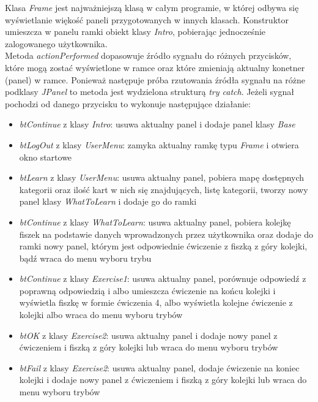 \documentclass[11pt]{article}
\begin{document}
Klasa \textit{Frame} jest najważniejszą klasą w całym programie, w której odbywa się wyświetlanie więkość paneli przygotowanych w innych klasach. Konstruktor umieszcza w panelu ramki obiekt klasy \textit{Intro}, pobierając jednocześnie zalogowanego użytkownika. \\
Metoda \textit{actionPerformed} dopasowuje źródło sygnału do różnych przycisków, które mogą zostać wyświetlone w ramce oraz które zmieniają aktualny konetner (panel) w ramce. Ponieważ następuje próba rzutowania źródła sygnału na różne podklasy \textit{JPanel} to metoda jest wydzielona strukturą \textit{try catch}. Jeżeli sygnał pochodzi od danego przycisku to wykonuje następujące działanie:
\begin{itemize}
	\item \textit{btContinue} z klasy \textit{Intro}: usuwa aktualny panel i dodaje panel klasy \textit{Base}
	
	\item \textit{btLogOut} z klasy \textit{UserMenu}: zamyka aktualny ramkę typu \textit{Frame} i otwiera okno startowe
	
	\item \textit{btLearn} z klasy \textit{UserMenu}: usuwa aktualny panel, pobiera mapę dostępnych kategorii oraz ilość kart w nich się znajdujących, listę kategorii, tworzy nowy panel klasy \textit{WhatToLearn} i dodaje go do ramki

	\item \textit{btContinue} z klasy \textit{WhatToLearn}: usuwa aktualny panel, pobiera kolejkę fiszek na podstawie danych wprowadzonych przez użytkownika oraz dodaje do ramki nowy panel, którym jest odpowiednie ćwiczenie z fiszką z góry kolejki, bądź wraca do menu wyboru trybu

	\item \textit{btContinue} z klasy \textit{Exercise1}: usuwa aktualny panel, porównuje odpowiedź z poprawną odpowiedzią i albo umieszcza ćwiczenie na końcu kolejki i wyświetla fiszkę w formie ćwiczenia 4, albo wyświetla kolejne ćwiczenie z kolejki albo wraca do menu wyboru trybów
	
	\item \textit{btOK} z klasy \textit{Exercise2}: usuwa aktualny panel i dodaje nowy panel z ćwiczeniem i fiszką z góry kolejki lub wraca do menu wyboru trybów
	
	\item \textit{btFail} z klasy \textit{Exercise2}: usuwa aktualny panel, dodaje ćwiczenie na koniec kolejki i dodaje nowy panel z ćwiczeniem i fiszką z góry kolejki lub wraca do menu wyboru trybów
	

\end{itemize}
\end{document}

